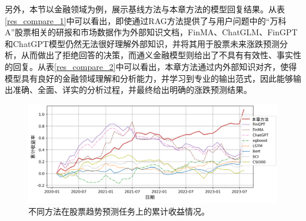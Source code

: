 另外，本节以金融领域为例，展示基线方法与本章方法的模型回复结果。从表\ref{res_compare_1}中可以看出，即使通过RAG方法提供了与用户问题中的“万科A”股票相关的研报和市场数据作为外部知识文档，FinMA、ChatGLM、FinGPT和ChatGPT模型仍然无法很好理解外部知识，并将其用于股票未来涨跌预测分析，从而做出了拒绝回答的决策，而通义金融模型则给出了不具有有效性、事实性的回复。从表\ref{res_compare_2}中可以看出，本章方法通过内外部知识对齐，使得模型具有良好的金融领域理解和分析能力，并学习到专业的输出范式，因此能够输出准确、全面、详实的分析过程，并最终给出明确的涨跌预测结果。


\begin{figure}[htbp]
	\centering
	\includegraphics[scale=0.54]{Fig/stock_trend_exp.png}
	\caption{\label{stock_trend_exp}不同方法在股票趋势预测任务上的累计收益情况。}
\end{figure}

